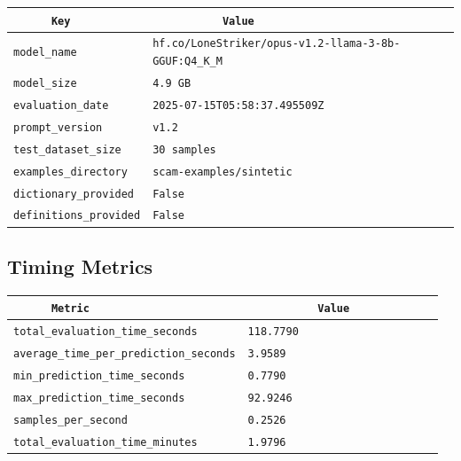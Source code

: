 \documentclass{article}
\begin{document}
\begin{center}
\begin{tabular}{l | l} \hline
    \verb|      Key      | & \verb|           Value           | \\ \hline
    \hline
    \verb|model_name    | & \verb|hf.co/LoneStriker/opus-v1.2-llama-3-8b-GGUF:Q4_K_M| \\ \hline
    \verb|model_size    | & \verb|4.9 GB                       | \\ \hline
    \verb|evaluation_date| & \verb|2025-07-15T05:58:37.495509Z  | \\ \hline
    \verb|prompt_version| & \verb|v1.2                         | \\ \hline
    \verb|test_dataset_size| & \verb|30 samples                   | \\ \hline
    \verb|examples_directory| & \verb|scam-examples/sintetic       | \\ \hline
    \verb|dictionary_provided| & \verb|False                        | \\ \hline
    \verb|definitions_provided| & \verb|False                        | \\ \hline
\end{tabular}
\end{center}

\subsection{Timing Metrics}

\begin{center}
\begin{tabular}{l | l} \hline
    \verb|      Metric     | & \verb|           Value           | \\ \hline
    \hline
    \verb|total_evaluation_time_seconds| & \verb|118.7790                     | \\ \hline
    \verb|average_time_per_prediction_seconds| & \verb|3.9589                       | \\ \hline
    \verb|min_prediction_time_seconds| & \verb|0.7790                       | \\ \hline
    \verb|max_prediction_time_seconds| & \verb|92.9246                      | \\ \hline
    \verb|samples_per_second| & \verb|0.2526                       | \\ \hline
    \verb|total_evaluation_time_minutes| & \verb|1.9796                       | \\ \hline
\end{tabular}
\end{center}
\end{document}
